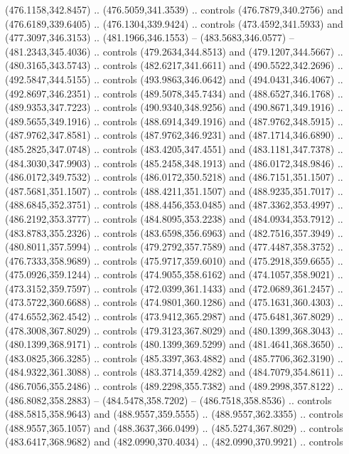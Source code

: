 \begin{scope}[cm={{1.25,0.0,0.0,-1.25,(0.0,743.43331)}}]
    (476.1158,342.8457) .. (476.5059,341.3539) .. controls (476.7879,340.2756) and
    (476.6189,339.6405) .. (476.1304,339.9424) .. controls (473.4592,341.5933) and
    (477.3097,346.3153) .. (481.1966,346.1553) -- (483.5683,346.0577) --
    (481.2343,345.4036) .. controls (479.2634,344.8513) and (479.1207,344.5667) ..
    (480.3165,343.5743) .. controls (482.6217,341.6611) and (490.5522,342.2696) ..
    (492.5847,344.5155) .. controls (493.9863,346.0642) and (494.0431,346.4067) ..
    (492.8697,346.2351) .. controls (489.5078,345.7434) and (488.6527,346.1768) ..
    (489.9353,347.7223) .. controls (490.9340,348.9256) and (490.8671,349.1916) ..
    (489.5655,349.1916) .. controls (488.6914,349.1916) and (487.9762,348.5915) ..
    (487.9762,347.8581) .. controls (487.9762,346.9231) and (487.1714,346.6890) ..
    (485.2825,347.0748) .. controls (483.4205,347.4551) and (483.1181,347.7378) ..
    (484.3030,347.9903) .. controls (485.2458,348.1913) and (486.0172,348.9846) ..
    (486.0172,349.7532) .. controls (486.0172,350.5218) and (486.7151,351.1507) ..
    (487.5681,351.1507) .. controls (488.4211,351.1507) and (488.9235,351.7017) ..
    (488.6845,352.3751) .. controls (488.4456,353.0485) and (487.3362,353.4997) ..
    (486.2192,353.3777) .. controls (484.8095,353.2238) and (484.0934,353.7912) ..
    (483.8783,355.2326) .. controls (483.6598,356.6963) and (482.7516,357.3949) ..
    (480.8011,357.5994) .. controls (479.2792,357.7589) and (477.4487,358.3752) ..
    (476.7333,358.9689) .. controls (475.9717,359.6010) and (475.2918,359.6655) ..
    (475.0926,359.1244) .. controls (474.9055,358.6162) and (474.1057,358.9021) ..
    (473.3152,359.7597) .. controls (472.0399,361.1433) and (472.0689,361.2457) ..
    (473.5722,360.6688) .. controls (474.9801,360.1286) and (475.1631,360.4303) ..
    (474.6552,362.4542) .. controls (473.9412,365.2987) and (475.6481,367.8029) ..
    (478.3008,367.8029) .. controls (479.3123,367.8029) and (480.1399,368.3043) ..
    (480.1399,368.9171) .. controls (480.1399,369.5299) and (481.4641,368.3650) ..
    (483.0825,366.3285) .. controls (485.3397,363.4882) and (485.7706,362.3190) ..
    (484.9322,361.3088) .. controls (483.3714,359.4282) and (484.7079,354.8611) ..
    (486.7056,355.2486) .. controls (489.2298,355.7382) and (489.2998,357.8122) ..
    (486.8082,358.2883) -- (484.5478,358.7202) -- (486.7518,358.8536) .. controls
    (488.5815,358.9643) and (488.9557,359.5555) .. (488.9557,362.3355) .. controls
    (488.9557,365.1057) and (488.3637,366.0499) .. (485.5274,367.8029) .. controls
    (483.6417,368.9682) and (482.0990,370.4034) .. (482.0990,370.9921) .. controls

\end{scope}
